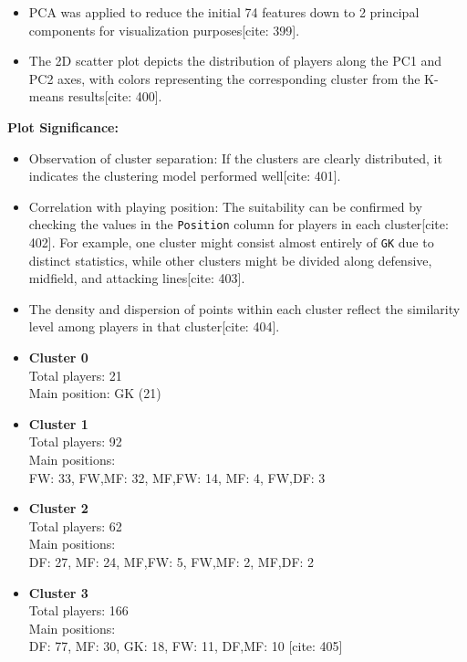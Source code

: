\documentclass[12pt]{report}
\begin{document}
{{{
\begin{itemize}
  \item PCA was applied to reduce the initial 74 features down to 2 principal components for visualization purposes[cite: 399].
  \item The 2D scatter plot depicts the distribution of players along the PC1 and PC2 axes, with colors representing the corresponding cluster from the K-means results[cite: 400].
\end{itemize}

\textbf{Plot Significance:}
\begin{itemize}
  \item Observation of cluster separation: If the clusters are clearly distributed, it indicates the clustering model performed well[cite: 401].
  \item Correlation with playing position: The suitability can be confirmed by checking the values in the \texttt{Position} column for players in each cluster[cite: 402]. For example, one cluster might consist almost entirely of \texttt{GK} due to distinct statistics, while other clusters might be divided along defensive, midfield, and attacking lines[cite: 403].
  \item The density and dispersion of points within each cluster reflect the similarity level among players in that cluster[cite: 404].
\end{itemize}


\begin{itemize}
  \item \textbf{Cluster 0} \\
  Total players: 21 \\
  Main position: GK (21)

  \item \textbf{Cluster 1} \\
  Total players: 92 \\
  Main positions: \\
  \quad FW: 33, FW,MF: 32, MF,FW: 14, MF: 4, FW,DF: 3

  \item \textbf{Cluster 2} \\
  Total players: 62 \\
  Main positions: \\
  \quad DF: 27, MF: 24, MF,FW: 5, FW,MF: 2, MF,DF: 2

  \item \textbf{Cluster 3} \\
  Total players: 166 \\
  Main positions: \\
  \quad DF: 77, MF: 30, GK: 18, FW: 11, DF,MF: 10 [cite: 405]


\end{itemize}}}}
\end{document}
